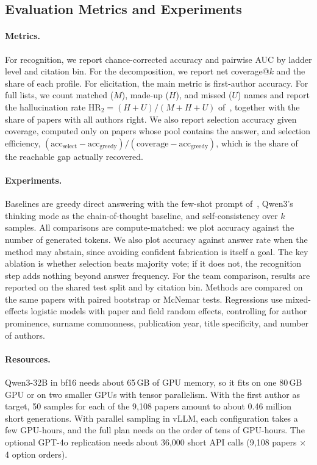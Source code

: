 \documentclass[sigconf,nonacm]{acmart}
\newcommand{\HRtwo}{\mathrm{HR}_2}
\begin{document}
\subsection{Evaluation Metrics and Experiments}

\paragraph{Metrics.}
For recognition, we report chance-corrected accuracy and pairwise AUC by ladder level and citation bin. For the decomposition, we report net coverage@$k$ and the share of each profile. For elicitation, the main metric is first-author accuracy. For full lists, we count matched ($M$), made-up ($H$), and missed ($U$) names and report the hallucination rate $\HRtwo = (H+U)/(M+H+U)$ of~\cite{zhong2026dreaming}, together with the share of papers with all authors right. We also report selection accuracy given coverage, computed only on papers whose pool contains the answer, and selection efficiency, $(\mathrm{acc}_{\mathrm{select}} - \mathrm{acc}_{\mathrm{greedy}}) / (\mathrm{coverage} - \mathrm{acc}_{\mathrm{greedy}})$, which is the share of the reachable gap actually recovered.

\paragraph{Experiments.}
Baselines are greedy direct answering with the few-shot prompt of~\cite{zhong2026dreaming}, Qwen3's thinking mode as the chain-of-thought baseline, and self-consistency over $k$ samples. All comparisons are compute-matched: we plot accuracy against the number of generated tokens. We also plot accuracy against answer rate when the method may abstain, since avoiding confident fabrication is itself a goal. The key ablation is whether selection beats majority vote; if it does not, the recognition step adds nothing beyond answer frequency. For the team comparison, results are reported on the shared test split and by citation bin. Methods are compared on the same papers with paired bootstrap or McNemar tests. Regressions use mixed-effects logistic models with paper and field random effects, controlling for author prominence, surname commonness, publication year, title specificity, and number of authors.

\paragraph{Resources.}
Qwen3-32B in bf16 needs about 65\,GB of GPU memory, so it fits on one 80\,GB GPU or on two smaller GPUs with tensor parallelism. With the first author as target, 50 samples for each of the 9,108 papers amount to about 0.46 million short generations. With parallel sampling in vLLM, each configuration takes a few GPU-hours, and the full plan needs on the order of tens of GPU-hours. The optional GPT-4o replication needs about 36{,}000 short API calls (9,108 papers $\times$ 4 option orders).
\end{document}
